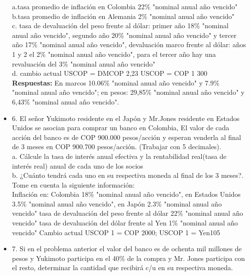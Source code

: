 \begin{itemize}
       a.tasa promedio de inflación en Colombia 22\% "nominal anual año vencido"\\
       b.tasa promedio de inflación en Alemania 2\% "nominal anual año vencido"\\
       c.   tasa  de  devaluación  del  peso  frente  al  dólar:  primer  año  18\% "nominal anual año vencido", segundo  año  20\% "nominal anual año vencido"  y  tercer  año  17\% "nominal anual año vencido",  devaluación  marco frente  al  dólar:  años  1  y  2  el  2\% "nominal anual año vencido",  para  el  tercer  año  hay  una revaluación del 3\% "nominal anual año vencido"\\
       d. cambio actual USCOP  = DMCOP 2,23               USCOP  = COP 1 300\\
       \medskip
       \textbf{Respuestas:} En marcos 10.06\% "nominal anual año vencido" y 7.9\% "nominal anual año vencido"; en pesos: 29,85\% "nominal anual año vencido" y 6,43\% "nominal anual año vencido".\\
       \medskip

 \item 6. El señor Yukimoto residente en el Japón y Mr.Jones residente en Estados Unidos  se  asocian para comprar un banco en Colombia, El valor de cada acción del banco es de COP 900.000 pesos/acción y esperan venderla al final de 3 meses en COP 900.700 pesos/acción. (Trabajar con 5 decimales).\\

       a. Cálcule la tasa de interés anual efectiva y la rentabilidad real(tasa de interés real) anual de cada uno de los socios\\
       b. ¿Cuánto tendrá cada uno en su respectiva moneda al final de los 3 meses?. Tome en cuenta la siguiente información:\\

       Inflación en: Colombia 18\% "nominal anual año vencido", en Estados Unidos 3.5\% "nominal anual año vencido", en Japón 2.3\%  "nominal anual año vencido" tasa de devaluación del peso frente al dólar 22\%  "nominal anual año vencido" tasa de devaluación del dólar frente al Yen 1\% "nominal anual año vencido" Cambio actual USCOP 1 = COP 2000; USCOP 1 = Yen105
      \medskip

 \item 7. Si en el problema anterior el valor del banco es de ochenta mil millones de pesos y Yukimoto  participa en el 40\% de la compra y Mr. Jones participa con el resto, determinar la cantidad que  recibirá c/u en su respectiva moneda.\\
      \medskip


\end{itemize}
